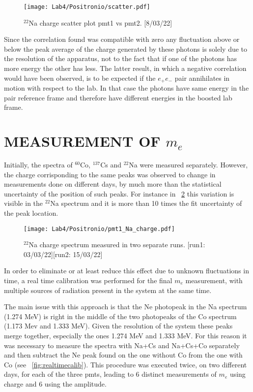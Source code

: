 \documentclass[10pt,a4paper,twocolumn]{article}
\begin{document}
\begin{figure}[h!]
\centering
\texttt{[image: Lab4/Positronio/scatter.pdf]} 
\caption{$^{22}$Na charge scatter plot pmt1 vs pmt2.
[8/03/22]}
\label{fig:energycorrelationscatter}
\end{figure}

\noindent Since the correlation found was compatible with zero any fluctuation above or below the peak average of the charge generated by these photons is solely due to the resolution of the apparatus, not to the fact that if one of the photons has more energy the other has less. The latter result, in which a negative correlation would have been observed, is to be expected if the $e_+e_-$ pair annihilates in motion with respect to the lab. In that case the photons have same energy in the pair reference frame and therefore have different energies in the boosted lab frame.




\section{MEASUREMENT OF $m_e$}
Initially, the spectra of $^{60}$Co, $^{137}$Cs and $^{22}$Na were measured separately.
However, the charge corrisponding to the same peaks was observed to change in measurements done on different days, by much more than the statistical uncertainty of the position of such peaks. For instance in \figurename~\ref{fig:sodiumdiscrepancy} this variation is visible in the $^{22}$Na spectrum and it is more than 10 times the fit uncertainty of the peak location. 
 
 
\begin{figure}[h!]
\centering
\texttt{[image: Lab4/Positronio/pmt1\_Na\_charge.pdf]} 
\caption{$^{22}$Na charge spectrum measured in two separate runs.
[run1: 03/03/22][run2: 15/03/22]}
\label{fig:sodiumdiscrepancy}
\end{figure}

In order to eliminate or at least reduce this effect due to unknown fluctuations in time, a real time calibration was performed for the final $m_e$ measurement, with multiple sources of radiation present in the system at the same time. 

The main issue with this approach is that the Ne photopeak in the Na spectrum (1.274 MeV) is right in the middle of the two photopeaks of the Co spectrum (1.173 Mev and 1.333 MeV). Given the resolution of the system these peaks merge together, especially the ones 1.274 MeV and 1.333 MeV. For this reason it was necessary to measure the spectra with Na+Cs and Na+Cs+Co separately and then subtract the Ne peak found on the one without Co from the one with Co (see \figurename~\ref{fig:realtimecalib}). This procedure was executed twice, on two different days, for each of the three pmts, leading to 6 distinct measurements of $m_e$ using charge and 6 using the amplitude.
\end{document}

